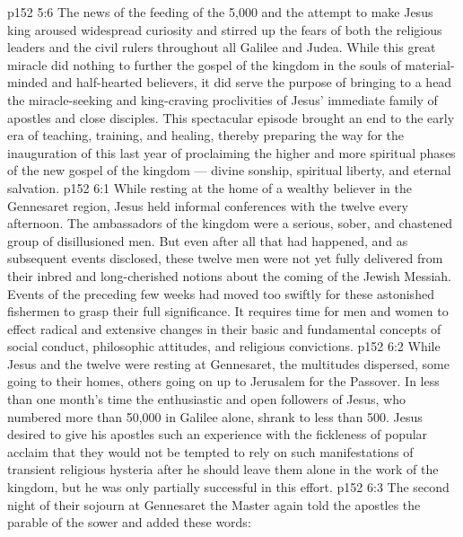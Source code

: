 \vs p152 5:6 The news of the feeding of the 5,000 and the attempt to make Jesus king aroused widespread curiosity and stirred up the fears of both the religious leaders and the civil rulers throughout all Galilee and Judea. While this great miracle did nothing to further the gospel of the kingdom in the souls of material\hyp{}minded and half\hyp{}hearted believers, it did serve the purpose of bringing to a head the miracle\hyp{}seeking and king\hyp{}craving proclivities of Jesus’ immediate family of apostles and close disciples. This spectacular episode brought an end to the early era of teaching, training, and healing, thereby preparing the way for the inauguration of this last year of proclaiming the higher and more spiritual phases of the new gospel of the kingdom --- divine sonship, spiritual liberty, and eternal salvation.
\vs p152 6:1 While resting at the home of a wealthy believer in the Gennesaret region, Jesus held informal conferences with the twelve every afternoon. The ambassadors of the kingdom were a serious, sober, and chastened group of disillusioned men. But even after all that had happened, and as subsequent events disclosed, these twelve men were not yet fully delivered from their inbred and long\hyp{}cherished notions about the coming of the Jewish Messiah. Events of the preceding few weeks had moved too swiftly for these astonished fishermen to grasp their full significance. It requires time for men and women to effect radical and extensive changes in their basic and fundamental concepts of social conduct, philosophic attitudes, and religious convictions.
\vs p152 6:2 While Jesus and the twelve were resting at Gennesaret, the multitudes dispersed, some going to their homes, others going on up to Jerusalem for the Passover. In less than one month’s time the enthusiastic and open followers of Jesus, who numbered more than 50,000 in Galilee alone, shrank to less than 500. Jesus desired to give his apostles such an experience with the fickleness of popular acclaim that they would not be tempted to rely on such manifestations of transient religious hysteria after he should leave them alone in the work of the kingdom, but he was only partially successful in this effort.
\vs p152 6:3 \pc The second night of their sojourn at Gennesaret the Master again told the apostles the parable of the sower and added these words: 
